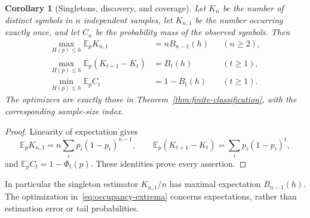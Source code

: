 \documentclass[11pt]{article}
\numberwithin{equation}{section}
\newtheorem{corollary}[theorem]{Corollary}
\newcommand{\EE}{\mathbb E}
\begin{document}
\begin{corollary}[Singletons, discovery, and coverage]\label{cor:occupancy}
Let $K_n$ be the number of distinct symbols in $n$ independent samples,
let $K_{n,1}$ be the number occurring exactly once, and let $C_n$ be the
probability mass of the observed symbols. Then
\begin{equation}\label{eq:occupancy-extrema}
 \begin{aligned}
 \max_{H(p)\le h}\EE_p K_{n,1}&=nB_{n-1}(h) &&(n\ge2),\\
 \max_{H(p)\le h}\EE_p(K_{t+1}-K_t)&=B_t(h) &&(t\ge1),\\
 \min_{H(p)\le h}\EE_p C_t&=1-B_t(h) &&(t\ge1).
 \end{aligned}
\end{equation}
The optimizers are exactly those in Theorem~\ref{thm:finite-classification},
with the corresponding sample-size index.
\end{corollary}
\begin{proof}
Linearity of expectation gives
\[
 \EE_p K_{n,1}=n\sum_i p_i(1-p_i)^{n-1},\qquad
 \EE_p(K_{t+1}-K_t)=\sum_i p_i(1-p_i)^t,
\]
and $\EE_p C_t=1-\Phi_t(p)$. These identities prove every assertion.
\end{proof}
In particular the singleton estimator $K_{n,1}/n$ has maximal expectation
$B_{n-1}(h)$. The optimization in~\eqref{eq:occupancy-extrema} concerns
expectations, rather than estimation error or tail probabilities.

\appendix
\end{document}
